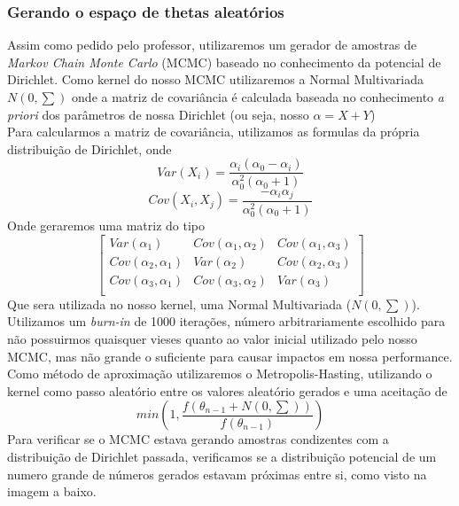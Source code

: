 \documentclass[twocolumn,amsmath,amssymb,floatfix]{revtex4}
\begin{document}
\subsubsection{Gerando o espaço de thetas aleatórios}
\indent Assim como pedido pelo professor, utilizaremos um gerador de amostras de \textit{Markov Chain Monte Carlo} (MCMC) baseado no conhecimento da potencial de Dirichlet. Como kernel do nosso MCMC utilizaremos a Normal Multivariada $N(0, \sum)$ onde a matriz de covariância é calculada baseada no conhecimento \textit{a priori} dos parâmetros de nossa Dirichlet (ou seja, nosso $\alpha = X + Y$) \\
\indent Para calcularmos a matriz de covariância, utilizamos as formulas da própria distribuição de Dirichlet, onde
\begin{equation}
    Var(X_i) = \frac{\alpha_i(\alpha_0-\alpha_i)}{\alpha_0^2(\alpha_0 + 1)}
\end{equation}
\begin{equation}
    Cov(X_i, X_j) = \frac{-\alpha_i\alpha_j}{\alpha_0^2(\alpha_0 + 1)}
\end{equation}
Onde geraremos uma matriz do tipo
\begin{equation}
    \begin{bmatrix}
        Var(\alpha_1) & Cov(\alpha_1,\alpha_2) & Cov(\alpha_1, \alpha_3)\\
        Cov(\alpha_2, \alpha_1) & Var(\alpha_2) & Cov(\alpha_2, \alpha_3)\\
        Cov(\alpha_3, \alpha_1) & Cov(\alpha_3,\alpha_2) & Var(\alpha_3)\\
    \end{bmatrix}
\end{equation}
Que sera utilizada no nosso kernel, uma Normal Multivariada ($N(0, \sum)$). \\
\indent Utilizamos um \textit{burn-in} de 1000 iterações, número arbitrariamente escolhido para não possuirmos quaisquer vieses quanto ao valor inicial utilizado pelo nosso MCMC, mas não grande o suficiente para causar impactos em nossa performance. \\
\indent Como método de aproximação utilizaremos o Metropolis-Hasting, utilizando o kernel como passo aleatório entre os valores aleatório gerados e uma aceitação de
\begin{equation}
    min(1, \frac{f(\theta_{n-1} + N(0, \sum))}{f(\theta_{n-1})})
\end{equation}
\indent Para verificar se o MCMC estava gerando amostras condizentes com a distribuição de Dirichlet passada, verificamos se a distribuição potencial de um numero grande de números gerados estavam próximas entre si, como visto na imagem a baixo.
\end{document}
